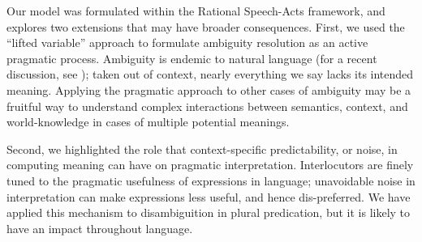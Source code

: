 \documentclass[preprint,12pt,authoryear,titlepage]{elsarticle}
\begin{document}
Our model was formulated within the Rational Speech-Acts framework, and explores two extensions that may have broader consequences. First, we used the ``lifted variable'' approach to formulate ambiguity resolution as an active pragmatic process.
Ambiguity is endemic to natural language (for a recent discussion, see \citealp{piantadosietal2012}); taken out of context, nearly everything we say lacks its intended meaning. Applying the pragmatic approach to other cases of ambiguity may be a fruitful way to understand complex interactions between semantics, context, and world-knowledge in cases of multiple potential meanings.

Second, we highlighted the role that context-specific predictability, or noise, in computing meaning can have on pragmatic interpretation. Interlocutors are finely tuned to the pragmatic usefulness of expressions in language; unavoidable noise in interpretation can make expressions less useful, and hence dis-preferred. We have applied this mechanism to disambiguition in plural predication, but it is likely to have an impact throughout language.



%
\end{document}
